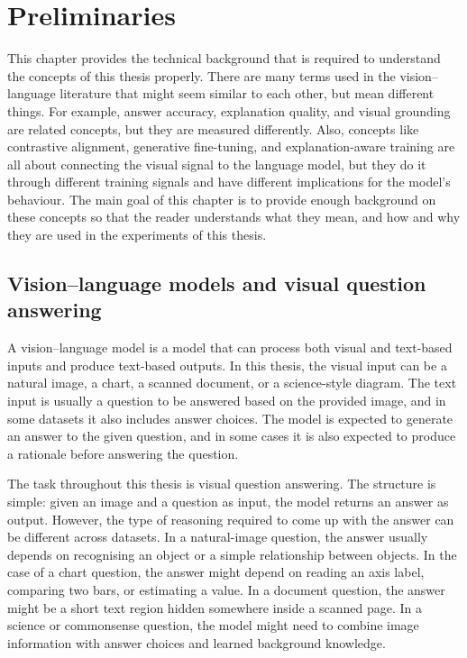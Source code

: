\documentclass[12pt,bibliography=totoc,listof=totoc,BCOR=5mm,DIV=12,oneside,open=any]{scrbook}
\begin{document}
\chapter{Preliminaries}
This chapter provides the technical background that is required to understand the concepts of this thesis properly.
There are many terms used in the vision--language literature that might seem similar to each other, but mean different things.
For example, answer accuracy, explanation quality, and visual grounding are related concepts, but they are measured differently.
Also, concepts like contrastive alignment, generative fine-tuning, and explanation-aware training are all about connecting the visual signal to the language model,
but they do it through different training signals and have different implications for the model's behaviour.
The main goal of this chapter is to provide enough background on these concepts so that the reader understands
what they mean, and how and why they are used in the experiments of this thesis.

\section{Vision--language models and visual question answering}
A vision--language model is a model that can process both visual and text-based inputs and produce text-based outputs.
In this thesis, the visual input can be a natural image, a chart, a scanned document, or a science-style diagram.
The text input is usually a question to be answered based on the provided image, and in some datasets it also includes answer choices.
The model is expected to generate an answer to the given question, and in some cases it is also expected to produce a rationale before answering the question.

The task throughout this thesis is visual question answering.
The structure is simple: given an image and a question as input, the model returns an answer as output.
However, the type of reasoning required to come up with the answer can be different across datasets.
In a natural-image question, the answer usually depends on recognising an object or a simple relationship between objects.
In the case of a chart question, the answer might depend on reading an axis label, comparing two bars, or estimating a value.
In a document question, the answer might be a short text region hidden somewhere inside a scanned page.
In a science or commonsense question, the model might need to combine image information with answer choices and learned background knowledge.
\end{document}
